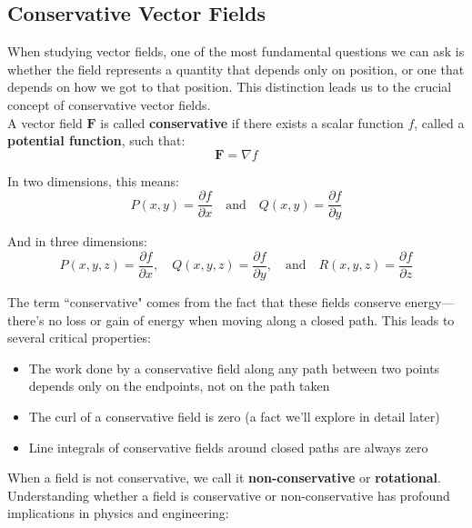 \subsection*{Conservative Vector Fields} 

\noindent When studying vector fields, one of the most fundamental questions we can ask is whether the field represents a quantity that depends only on position, or one that depends on how we got to that position. This distinction leads us to the crucial concept of conservative vector fields. \\

\noindent A vector field $\mathbf{F}$ is called \textbf{conservative} if there exists a scalar function $f$, called a \textbf{potential function}, such that:
\[
\mathbf{F} = \nabla f
\]

\noindent In two dimensions, this means:
\[
P(x,y) = \frac{\partial f}{\partial x} \quad \text{and} \quad Q(x,y) = \frac{\partial f}{\partial y}
\]

\noindent And in three dimensions:
\[
P(x,y,z) = \frac{\partial f}{\partial x}, \quad Q(x,y,z) = \frac{\partial f}{\partial y}, \quad \text{and} \quad R(x,y,z) = \frac{\partial f}{\partial z}
\]

\noindent The term ``conservative" comes from the fact that these fields conserve energy—there's no loss or gain of energy when moving along a closed path. This leads to several critical properties:

\begin{itemize}
   \item The work done by a conservative field along any path between two points depends only on the endpoints, not on the path taken
   \item The curl of a conservative field is zero (a fact we'll explore in detail later)
   \item Line integrals of conservative fields around closed paths are always zero
\end{itemize}

\noindent When a field is not conservative, we call it \textbf{non-conservative} or \textbf{rotational}. Understanding whether a field is conservative or non-conservative has profound implications in physics and engineering:

